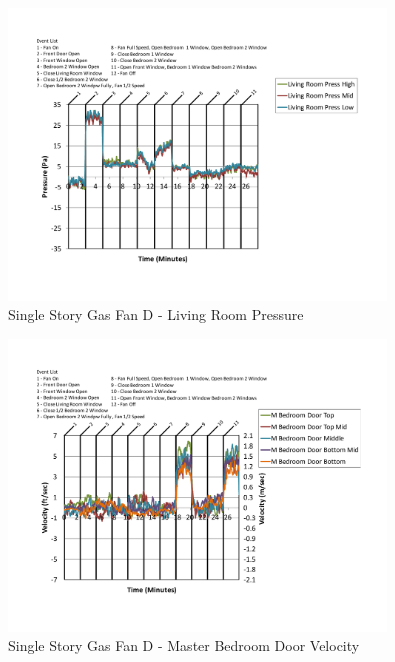\documentclass{article}
\begin{document}
\begin{appendices}
	\begin{figure}[H]
		\centering
		\includegraphics[height=3.05in,trim=0.67in 1.1in 0.67in 0.8in,clip=true]{0_Images/Results_Charts/ColdFlow/Single_Story/Gas/D/Living_Room_Pressure.pdf}
		\caption{Single Story Gas Fan D - Living Room Pressure}
	\end{figure}
 

	\begin{figure}[H]
		\centering
		\includegraphics[height=3.05in,trim=0.67in 1.1in 0.67in 0.8in,clip=true]{0_Images/Results_Charts/ColdFlow/Single_Story/Gas/D/Master_Bedroom_Door_Velocity.pdf}
		\caption{Single Story Gas Fan D - Master Bedroom Door Velocity}
	\end{figure}
 
	\clearpage


\end{appendices}
\end{document}
